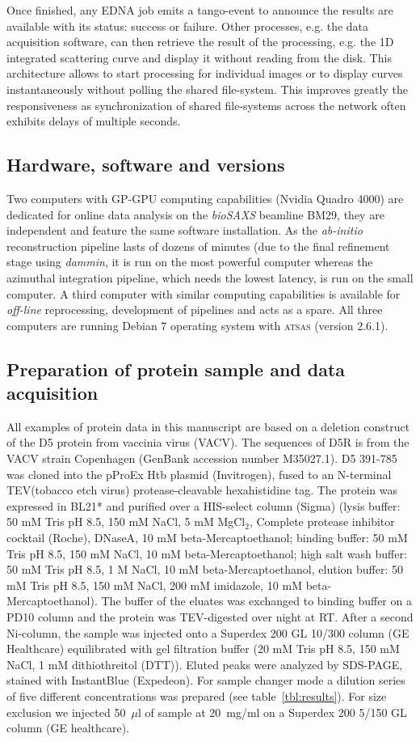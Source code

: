 \documentclass[preprint,pdf]{iucr}              %
\begin{document}
Once finished, any EDNA job emits a tango-event to announce the results are
available with its status: success or failure.
Other processes, e.g. the data acquisition software, can then retrieve the result
of the processing, e.g. the 1D integrated scattering curve and
display it without reading from the disk.
This architecture allows to start processing for individual images or to
display curves instantaneously without polling the shared file-system.
This improves greatly the responsiveness as synchronization of shared
file-systems across the network often exhibits delays of multiple seconds.

\subsection{Hardware, software and versions}
Two computers with GP-GPU computing capabilities (Nvidia Quadro 4000) are
dedicated for online data analysis on the \textit{bioSAXS} beamline BM29, they are
independent and feature the same software installation.
As the \textit{ab-initio} reconstruction pipeline lasts of dozens of minutes
(due to the final refinement stage using \textit{dammin}, it is run on the most
powerful computer whereas the azimuthal integration pipeline, which needs the lowest
latency, is run on the small computer.
A third computer with similar computing capabilities is available for
\textit{off-line} reprocessing, development of pipelines and acts as a spare.
All three computers are running Debian 7 operating system with \textsc{atsas}
(version 2.6.1).


\subsection{Preparation of protein sample and data acquisition}
All examples of protein data in this manuscript are based on a deletion construct of
the D5 protein from vaccinia virus (VACV).
The sequences of D5R is from the VACV strain Copenhagen (GenBank accession number M35027.1).
D5 391-785 was cloned into the pProEx Htb plasmid (Invitrogen), fused to an N-terminal
TEV(tobacco etch virus) protease-cleavable hexahistidine tag. The protein was expressed in
BL21* and purified over a HIS-select column (Sigma) (lysis buffer: 50 mM Tris pH 8.5, 150 mM NaCl,
5 mM MgCl$_{2}$, Complete protease inhibitor cocktail (Roche), DNaseA, 10 mM beta-Mercaptoethanol; binding buffer: 50 mM Tris pH 8.5, 150 mM NaCl, 10 mM beta-Mercaptoethanol; high salt wash buffer: 50 mM Tris pH 8.5, 1 M NaCl, 10 mM beta-Mercaptoethanol, elution buffer: 50 mM Tris pH 8.5, 150 mM NaCl,  200 mM imidazole, 10 mM beta-Mercaptoethanol). The buffer of the eluates was exchanged to binding buffer on a PD10 column and the protein was TEV-digested over night at RT. After a second Ni-column, the sample was injected onto a Superdex 200 GL 10/300 column (GE Healthcare) equilibrated with gel filtration buffer (20 mM Tris pH 8.5, 150 mM NaCl, 1 mM dithiothreitol (DTT)). Eluted peaks were analyzed by SDS-PAGE, stained with InstantBlue (Expedeon).
For sample changer mode a dilution series of five different concentrations was prepared
(see table~\ref{tbl:results}). For size exclusion we injected 50~$\mu$l of sample at 20~mg/ml on a Superdex
200 5/150 GL column (GE healthcare).
\end{document}
